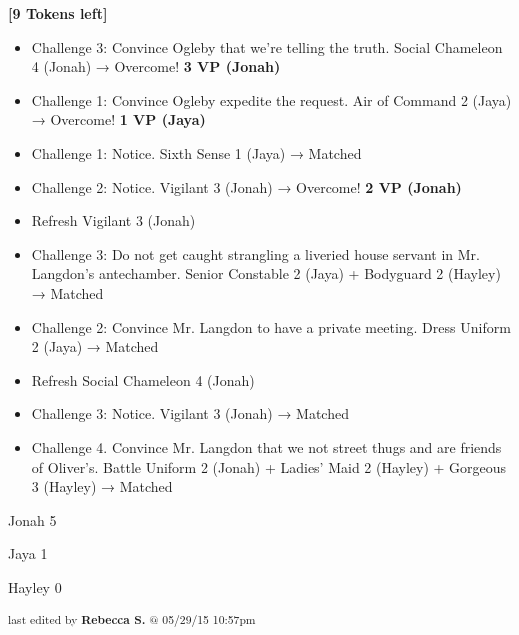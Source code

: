 \textbf{{[}9 Tokens left{]}}





\begin{itemize}
\item Challenge 3: Convince Ogleby that we're telling the truth. Social Chameleon 4 (Jonah) → Overcome! \textbf{3 VP (Jonah)}
\item Challenge 1: Convince Ogleby expedite the request. Air of Command 2 (Jaya) → Overcome! \textbf{1 VP (Jaya)}
\item Challenge 1: Notice. Sixth Sense 1 (Jaya) → Matched
\item Challenge 2: Notice. Vigilant 3 (Jonah) → Overcome! \textbf{2 VP (Jonah)}
\item Refresh Vigilant 3 (Jonah)
\item Challenge 3: Do not get caught strangling a liveried house servant in Mr. Langdon's antechamber. Senior Constable 2 (Jaya) + Bodyguard 2 (Hayley) → Matched
\item Challenge 2: Convince Mr. Langdon to have a private meeting. Dress Uniform 2 (Jaya) → Matched
\item Refresh Social Chameleon 4 (Jonah)
\item Challenge 3: Notice. Vigilant 3 (Jonah) → Matched
\item Challenge 4.  Convince Mr. Langdon that we not street thugs and are friends of Oliver's.  Battle Uniform 2 (Jonah) + Ladies' Maid 2 (Hayley) + Gorgeous 3 (Hayley)  → Matched
\end{itemize}



Jonah 5

Jaya 1

Hayley 0






\vspace{\fill}

\begin{flushright}
\textsubscript{last edited by \textbf{Rebecca S.} @ 05/29/15 10:57pm}
\end{flushright}

